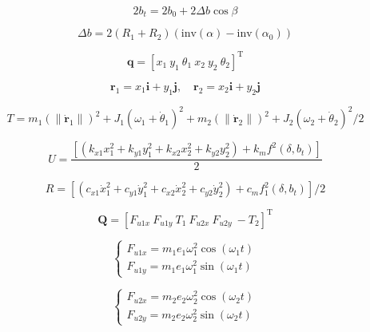 \begin{equation}
	2b_t = 2b_0 + 2\Delta b \cos \beta
	\label{eq:bt_cos}
\end{equation}

\begin{equation}
	\Delta b = 2(R_1 + R_2)(\mathrm{inv}(\alpha) - \mathrm{inv}(\alpha_0))
	\label{eq:delta_b}
\end{equation}

\begin{equation}
	\boldsymbol{q} = [x_1 \ y_1 \ \theta_1 \ x_2 \ y_2 \ \theta_2]^{\mathrm{T}}
	\label{eq:vetor_q}
\end{equation}

\begin{equation}
	\boldsymbol{r}_1 = x_1\boldsymbol{i} + y_1\boldsymbol{j}, \quad \boldsymbol{r}_2 = x_2\boldsymbol{i} + y_2\boldsymbol{j}
	\label{eq:vetores_r1_r2}
\end{equation}

\begin{equation}
	T = m_1(\|\dot{\boldsymbol{r}}_1\|)^2 + J_1(\omega_1 + \dot{\theta}_1)^2 + m_2(\|\dot{\boldsymbol{r}}_2\|)^2 + J_2(\omega_2 + \dot{\theta}_2)^2 / 2
	\label{eq:energia_cinetica}
\end{equation}

\begin{equation}
	U = \frac{[ (k_{x1}x_1^2 + k_{y1}y_1^2 + k_{x2}x_2^2 + k_{y2}y_2^2) + k_m f^2(\delta, b_t) ]}{2}
	\label{eq:energia_potencial}
\end{equation}

\begin{equation}
	R = [ (c_{x1}\dot{x}_1^2 + c_{y1}\dot{y}_1^2 + c_{x2}\dot{x}_2^2 + c_{y2}\dot{y}_2^2) + c_m f_1^2(\delta, b_t) ] / 2
	\label{eq:dissipacao}
\end{equation}

\begin{equation}
	\boldsymbol{Q} = [F_{u1x} \ F_{u1y} \ T_1 \ F_{u2x} \ F_{u2y} \ -T_2]^{\mathrm{T}}
	\label{eq:vetor_forcas}
\end{equation}

\begin{equation}
	\begin{cases} 
		F_{u1x} = m_1 e_1 \omega_1^2 \cos(\omega_1 t) \\
		F_{u1y} = m_1 e_1 \omega_1^2 \sin(\omega_1 t)
	\end{cases}
	\label{eq:desbal_eng1}
\end{equation}

\begin{equation}
	\begin{cases} 
		F_{u2x} = m_2 e_2 \omega_2^2 \cos(\omega_2 t) \\
		F_{u2y} = m_2 e_2 \omega_2^2 \sin(\omega_2 t)
	\end{cases}
	\label{eq:desbal_eng2}
\end{equation}

